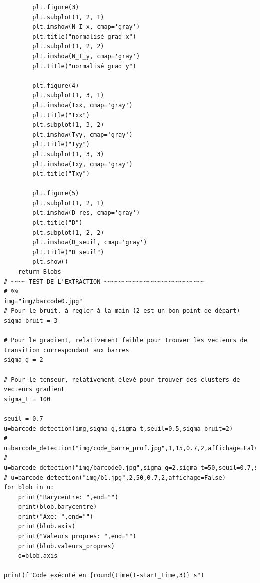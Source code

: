 \documentclass{rapport}
\begin{document}
\begin{lstlisting}
        plt.figure(3)
        plt.subplot(1, 2, 1)
        plt.imshow(N_I_x, cmap='gray')
        plt.title("normalisé grad x")
        plt.subplot(1, 2, 2)
        plt.imshow(N_I_y, cmap='gray')
        plt.title("normalisé grad y")

        plt.figure(4)
        plt.subplot(1, 3, 1)
        plt.imshow(Txx, cmap='gray')
        plt.title("Txx")
        plt.subplot(1, 3, 2)
        plt.imshow(Tyy, cmap='gray')
        plt.title("Tyy")
        plt.subplot(1, 3, 3)
        plt.imshow(Txy, cmap='gray')
        plt.title("Txy")

        plt.figure(5)
        plt.subplot(1, 2, 1)
        plt.imshow(D_res, cmap='gray')
        plt.title("D")
        plt.subplot(1, 2, 2)
        plt.imshow(D_seuil, cmap='gray')
        plt.title("D seuil")        
        plt.show()      
    return Blobs
# ~~~~ TEST DE L'EXTRACTION ~~~~~~~~~~~~~~~~~~~~~~~~~~~~
# %%
img="img/barcode0.jpg"
# Pour le bruit, à regler à la main (2 est un bon point de départ)
sigma_bruit = 3

# Pour le gradient, relativement faible pour trouver les vecteurs de transition correspondant aux barres
sigma_g = 2

# Pour le tenseur, relativement élevé pour trouver des clusters de vecteurs gradient
sigma_t = 100

seuil = 0.7 
u=barcode_detection(img,sigma_g,sigma_t,seuil=0.5,sigma_bruit=2)
# u=barcode_detection("img/code_barre_prof.jpg",1,15,0.7,2,affichage=False)
# u=barcode_detection("img/barcode0.jpg",sigma_g=2,sigma_t=50,seuil=0.7,sigma_bruit=2)
# u=barcode_detection("img/b1.jpg",2,50,0.7,2,affichage=False)
for blob in u:
    print("Barycentre: ",end="")
    print(blob.barycentre)
    print("Axe: ",end="")
    print(blob.axis)
    print("Valeurs propres: ",end="")
    print(blob.valeurs_propres)
    o=blob.axis

print(f"Code exécuté en {round(time()-start_time,3)} s")
\end{lstlisting}
\end{document}

